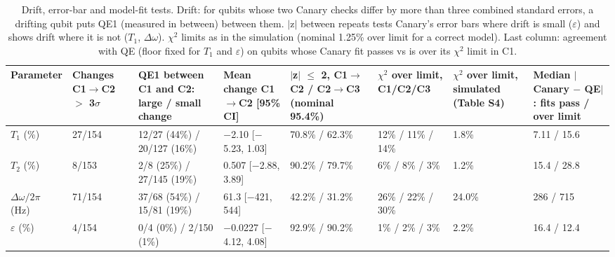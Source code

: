 \begin{table}[!t]
\centering
\footnotesize
\caption{Drift, error-bar and model-fit tests. Drift: for qubits whose two Canary checks differ by more than three combined standard errors, a drifting qubit puts QE1 (measured in between) between them. $|$z$|$ between repeats tests Canary's error bars where drift is small ($\varepsilon$) and shows drift where it is not ($T_1$, $\Delta\omega$). $\chi$$^2$ limits as in the simulation (nominal 1.25\% over limit for a correct model). Last column: agreement with QE (floor fixed for $T_1$ and $\varepsilon$) on qubits whose Canary fit passes vs is over its $\chi$$^2$ limit in C1.}
\label{tab:h3}
\begin{adjustbox}{max width=\linewidth}
\begin{tabular}{llllllll}
\hline
Parameter & Changes C1$\to$C2 $>$ 3$\sigma$ & QE1 between C1 and C2: large / small change & Mean change C1$\to$C2 [95\% CI] & $|$z$|$ $\leq$ 2, C1$\to$C2 / C2$\to$C3 (nominal 95.4\%) & $\chi$$^2$ over limit, C1/C2/C3 & $\chi$$^2$ over limit, simulated (Table S4) & Median $|$Canary $-$ QE$|$: fits pass / over limit \\
\hline
$T_1$ (\%) & 27/154 & 12/27 (44\%) / 20/127 (16\%) & $-$2.10 [$-$5.23, 1.03] & 70.8\% / 62.3\% & 12\% / 11\% / 14\% & 1.8\% & 7.11 / 15.6 \\
$T_2$ (\%) & 8/153 & 2/8 (25\%) / 27/145 (19\%) & 0.507 [$-$2.88, 3.89] & 90.2\% / 79.7\% & 6\% / 8\% / 3\% & 1.2\% & 15.4 / 28.8 \\
$\Delta\omega/2\pi$ (Hz) & 71/154 & 37/68 (54\%) / 15/81 (19\%) & 61.3 [$-$421, 544] & 42.2\% / 31.2\% & 26\% / 22\% / 30\% & 24.0\% & 286 / 715 \\
$\varepsilon$ (\%) & 4/154 & 0/4 (0\%) / 2/150 (1\%) & $-$0.0227 [$-$4.12, 4.08] & 92.9\% / 90.2\% & 1\% / 2\% / 3\% & 2.2\% & 16.4 / 12.4 \\
\hline
\end{tabular}
\end{adjustbox}
\end{table}

